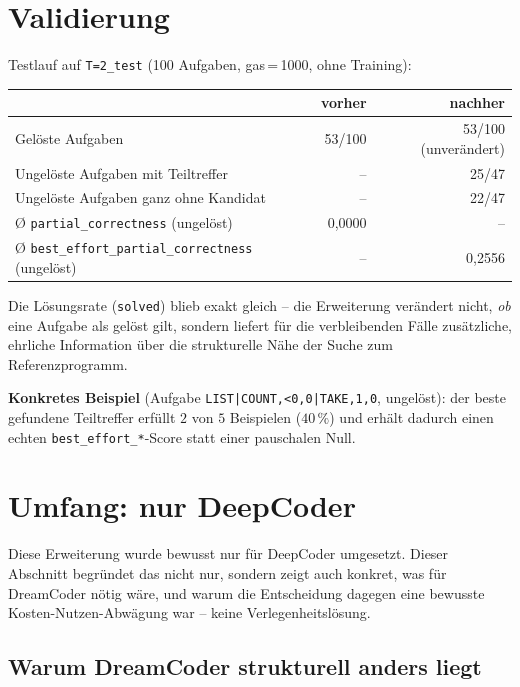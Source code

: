 \documentclass[11pt,a4paper]{article}
\begin{document}
\section{Validierung}

Testlauf auf \texttt{T=2\_test} (100 Aufgaben, gas\,=\,1000, ohne
Training):

\begin{center}
\begin{tabular}{lrr}
\toprule
& \textbf{vorher} & \textbf{nachher} \\
\midrule
Gelöste Aufgaben & 53/100 & 53/100 (unverändert) \\
Ungelöste Aufgaben mit Teiltreffer & -- & 25/47 \\
Ungelöste Aufgaben ganz ohne Kandidat & -- & 22/47 \\
Ø \texttt{partial\_correctness} (ungelöst) & 0{,}0000 & -- \\
Ø \texttt{best\_effort\_partial\_correctness} (ungelöst) & -- & 0{,}2556 \\
\bottomrule
\end{tabular}
\end{center}

Die Lösungsrate (\texttt{solved}) blieb exakt gleich -- die Erweiterung
verändert nicht, \emph{ob} eine Aufgabe als gelöst gilt, sondern liefert
für die verbleibenden Fälle zusätzliche, ehrliche Information über die
strukturelle Nähe der Suche zum Referenzprogramm.

\textbf{Konkretes Beispiel} (Aufgabe \texttt{LIST|COUNT,<0,0|TAKE,1,0},
ungelöst): der beste gefundene Teiltreffer erfüllt $2$ von $5$ Beispielen
($40\,\%$) und erhält dadurch einen echten \texttt{best\_effort\_*}-Score
statt einer pauschalen Null.

\section{Umfang: nur DeepCoder}
\label{sec:scope}

Diese Erweiterung wurde bewusst nur für DeepCoder umgesetzt. Dieser
Abschnitt begründet das nicht nur, sondern zeigt auch konkret, was für
DreamCoder nötig wäre, und warum die Entscheidung dagegen eine bewusste
Kosten-Nutzen-Abwägung war -- keine Verlegenheitslösung.

\subsection{Warum DreamCoder strukturell anders liegt}
\end{document}
